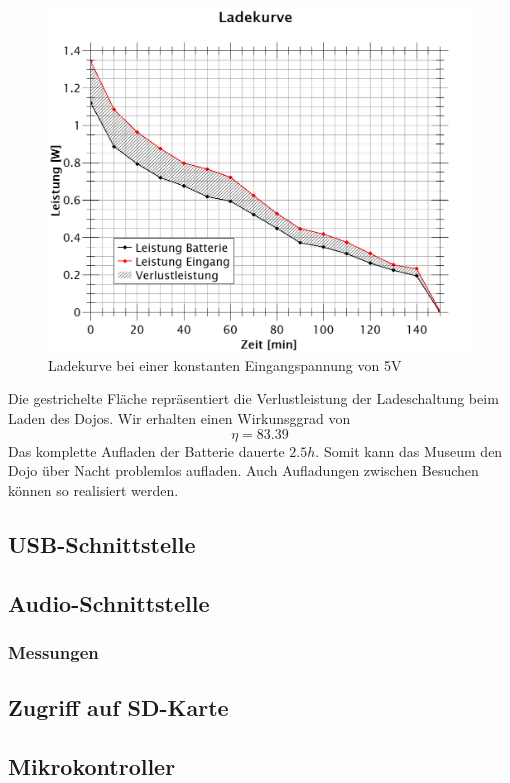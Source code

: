 \begin{figure}[h]
	\centering
	\includegraphics[width=\textwidth]{graphics/ladekurve.png}
	\caption{Ladekurve bei einer konstanten Eingangspannung von 5V}
	\label{fig:Ladeleistung}
\end{figure}

Die gestrichelte Fläche repräsentiert die Verlustleistung der Ladeschaltung beim Laden des Dojos.
Wir erhalten einen Wirkunsggrad von
\begin{equation}
\eta = 83.39%
\end{equation}
Das komplette Aufladen der Batterie dauerte $2.5h$. Somit kann das Museum den Dojo über Nacht problemlos aufladen. Auch Aufladungen zwischen Besuchen können so realisiert werden.
\clearpage

\subsection{USB-Schnittstelle}

\subsection{Audio-Schnittstelle}

\subsubsection{Messungen}

\subsection{Zugriff auf SD-Karte}

\subsection{Mikrokontroller}